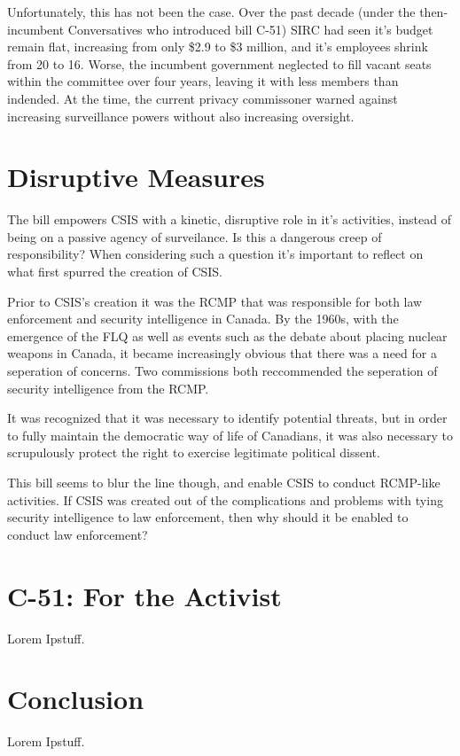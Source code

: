 \documentclass[a4paper, 11pt]{article} %
\begin{document}
Unfortunately, this has not been the case. Over the past decade (under the then-incumbent Conversatives who introduced bill C-51) SIRC had seen it's budget remain flat, increasing from only \$2.9 to \$3 million, and it's employees shrink from 20 to 16. Worse, the incumbent government neglected to fill vacant seats within the committee over four years, leaving it with less members than indended. At the time, the current privacy commissoner warned against increasing surveillance powers without also increasing oversight. \cite{watchdog-starved}

\section*{Disruptive Measures}
The bill empowers CSIS with a kinetic, disruptive role in it's activities, instead of being on a passive agency of surveilance. Is this a dangerous creep of responsibility? When considering such a question it's important to reflect on what first spurred the creation of CSIS.

Prior to CSIS's creation it was the RCMP that was responsible for both law enforcement and security intelligence in Canada. By the 1960s, with the emergence of the FLQ as well as events such as the debate about placing nuclear weapons in Canada, it became increasingly obvious that there was a need for a seperation of concerns. Two commissions both reccommended the seperation of security intelligence from the RCMP.

It was recognized that it was necessary to identify potential threats, but in order to fully maintain the democratic way of life of Canadians, it was also necessary to scrupulously protect the right to exercise legitimate political dissent. \cite{history-of-csis}

This bill seems to blur the line though, and enable CSIS to conduct RCMP-like activities. If CSIS was created out of the complications and problems with tying security intelligence to law enforcement, then why should it be enabled to conduct law enforcement?

\section*{C-51: For the Activist}
Lorem Ipstuff.


\section*{Conclusion}
Lorem Ipstuff.







\end{document}
